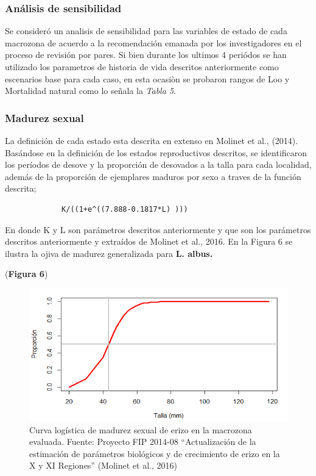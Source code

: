 \documentclass[
]{article}
\begin{document}
\hypertarget{anuxe1lisis-de-sensibilidad}{%
\subsubsection{Análisis de
sensibilidad}\label{anuxe1lisis-de-sensibilidad}}

Se consideró un analisis de sensibilidad para las variables de estado de
cada macrozona de acuerdo a la recomendación emanada por los
investigadores en el proceso de revisión por pares. Si bien durante los
ultimos 4 periódos se han utilizado los parametros de historia de vida
descritos anteriormente como escenarios base para cada caso, en esta
ocasiòn se probaron rangos de Loo y Mortalidad natural como lo señala la
\emph{Tabla 5}.

\hypertarget{madurez-sexual}{%
\subsubsection{Madurez sexual}\label{madurez-sexual}}

La definición de cada estado esta descrita en extenso en Molinet et al.,
(2014). Basándose en la definición de los estados reproductivos
descritos, se identificaron los períodos de desove y la proporción de
desovados a la talla para cada localidad, además de la proporción de
ejemplares maduros por sexo a traves de la función descrita;

\begin{verbatim}
             K/((1+e^((7.888-0.1817*L) )))
\end{verbatim}

En donde K y L son parámetros descritos anteriormente y que son los
parámetros descritos anteriormente y extraídos de Molinet et al., 2016.
En la Figura 6 se ilustra la ojiva de madurez generalizada para
\textbf{L. albus.}

(\textbf{Figura 6})

\begin{figure}
\centering
\includegraphics[width=12cm,height=\textheight]{Figuras/Madurez.png}
\caption{Curva logística de madurez sexual de erizo en la macrozona
evaluada. Fuente: Proyecto FIP 2014-08 ``Actualización de la estimación
de parámetros biológicos y de crecimiento de erizo en la X y XI
Regiones'' (Molinet et al., 2016)}
\end{figure}
\end{document}
